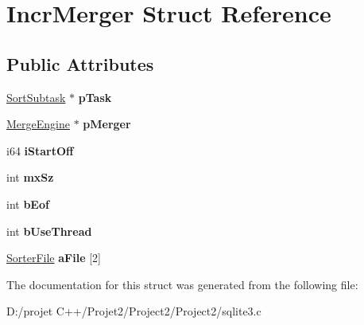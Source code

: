\hypertarget{struct_incr_merger}{}\section{Incr\+Merger Struct Reference}
\label{struct_incr_merger}
\subsection*{Public Attributes}
\begin{DoxyCompactItemize}
\item 
\mbox{\label{struct_incr_merger_a2b941a6bbca7d5c0fc0c0391c44eccda}} 
\mbox{\hyperlink{struct_sort_subtask}{Sort\+Subtask}} $\ast$ {\bfseries p\+Task}
\item 
\mbox{\label{struct_incr_merger_ac7335fe89a94112b63e206ac48656f4e}} 
\mbox{\hyperlink{struct_merge_engine}{Merge\+Engine}} $\ast$ {\bfseries p\+Merger}
\item 
\mbox{\label{struct_incr_merger_a88153aef88037ccac55eb5c9209a3e1b}} 
i64 {\bfseries i\+Start\+Off}
\item 
\mbox{\label{struct_incr_merger_a333e98e9e5e951e2e00a109a95c4fbab}} 
int {\bfseries mx\+Sz}
\item 
\mbox{\label{struct_incr_merger_af9ebc9bf53d72441086d98e379ca2721}} 
int {\bfseries b\+Eof}
\item 
\mbox{\label{struct_incr_merger_a5c4a9d27ce78f3edaa91c5d85c0f3474}} 
int {\bfseries b\+Use\+Thread}
\item 
\mbox{\label{struct_incr_merger_a276ff9bd9d3c7c9609cdfde70127bcc3}} 
\mbox{\hyperlink{struct_sorter_file}{Sorter\+File}} {\bfseries a\+File} \mbox{[}2\mbox{]}
\end{DoxyCompactItemize}


The documentation for this struct was generated from the following file\+:\begin{DoxyCompactItemize}
\item 
D\+:/projet C++/\+Projet2/\+Project2/\+Project2/sqlite3.\+c\end{DoxyCompactItemize}
